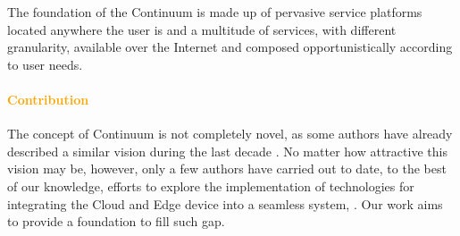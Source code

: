 The foundation of the Continuum is made up of pervasive service platforms located anywhere the user is and a multitude of services, with different granularity, available over the Internet and composed opportunistically according to user needs.


\paragraph{\textcolor{orange}{Contribution}}

The concept of Continuum is not completely novel, as some authors have already described a similar vision during the last decade \cite{latre2014fluid, beckman2020harnessing}. No matter how attractive this vision may be, however, only a few authors have carried out to date, to the best of our knowledge, efforts to explore the implementation of technologies for integrating the Cloud and Edge device into a seamless system, \cite{abdelbaky2017computing}. Our work aims to provide a foundation to fill such gap.

